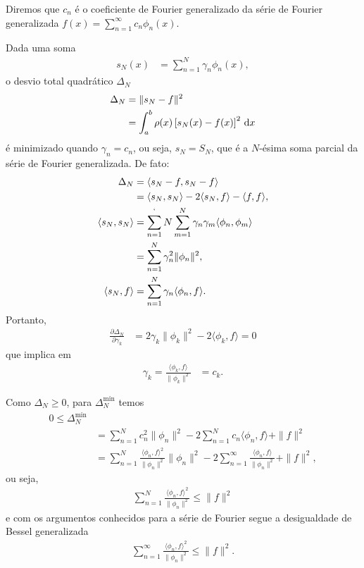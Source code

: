 Diremos que $c_n$ é o coeficiente de Fourier generalizado da série de Fourier generalizada $f(x) = \sum_{n = 1}^\infty c_n \phi_n(x)$.

Dada uma soma
\begin{align*}
    s_N(x) &= \sum_{n = 1}^N \gamma_n \phi_n(x),
\end{align*}
o desvio total quadrático $\Delta_N$
\begin{align*}
    \Delta_N &= \| s_N - f \|^2 \\
    &= \int_a^b \rho(x) \left[ s_N(x) - f(x) \right]^2 \, \mathrm{d}x
\end{align*}
é minimizado quando $\gamma_n = c_n$, ou seja, $s_N = S_N$, que é a $N$-ésima soma parcial da série de Fourier generalizada. De fato:
\begin{align*}
    \Delta_N &= \langle s_N - f, s_N - f \rangle \\
    &= \langle s_N, s_N \rangle - 2 \langle s_N, f \rangle - \langle f, f \rangle, \\
    \langle s_N, s_N \rangle &= \sum_{n = 1}^`N \sum_{m = 1}^N \gamma_n \gamma_m \langle \phi_n, \phi_m \rangle \\
    &= \sum_{n = 1}^N \gamma_n^2 \| \phi_n \|^2, \\
    \langle s_N, f \rangle &= \sum_{n = 1}^N \gamma_n \langle \phi_n, f \rangle.
\end{align*}
Portanto,
\begin{align*}
    \frac{\partial \Delta_N}{\partial \gamma_k} &= 2 \gamma_k \| \phi_k \|^2 - 2 \langle \phi_k, f \rangle = 0
\end{align*}
que implica em
\begin{align*}
    \gamma_k = \frac{\langle \phi_k, f \rangle}{\| \phi_k \|^2} &= c_k.
\end{align*}

Como $\Delta_N \geq 0$, para $\Delta_N^{\min{}}$ temos
\begin{align*}
    0 \leq \Delta_N^{\min{}} \\
    &= \sum_{n = 1}^N c_n^2 \| \phi_n \|^2 - 2 \sum_{n = 1}^N c_n \langle \phi_n, f \rangle + \| f \|^2 \\
    &= \sum_{n = 1}^N \frac{\langle \phi_n, f \rangle^2}{\| \phi_n \|^2} \| \phi_n \|^2 - 2 \sum_{n = 1}^\infty \frac{\langle \phi_n, f \rangle}{\| \phi_n \|^2} + \| f \|^2,
\end{align*}
ou seja,
\begin{align*}
    \sum_{n = 1}^N \frac{\langle \phi_n, f \rangle^2}{\| \phi_n \|^2} \leq \| f \|^2
\end{align*}
e com os argumentos conhecidos para a série de Fourier segue a desigualdade de Bessel generalizada
\begin{align*}
    \sum_{n = 1}^\infty \frac{\langle \phi_n, f \rangle^2}{\| \phi_n \|^2} \leq \| f \|^2.
\end{align*}


